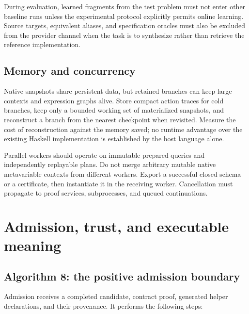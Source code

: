 \documentclass[11pt,letterpaper]{article}
\theoremstyle{definition}\newtheorem{definition}[theorem]{Definition}
\theoremstyle{remark}\newtheorem{remark}[theorem]{Remark}
\begin{document}
During evaluation, learned fragments from the test problem must not enter other
baseline runs unless the experimental protocol explicitly permits online
learning. Source targets, equivalent aliases, and specification oracles must also
be excluded from the provider channel when the task is to synthesize rather
than retrieve the reference implementation.

\subsection{Memory and concurrency}

Native snapshots share persistent data, but retained branches can keep large
contexts and expression graphs alive. Store compact action traces for cold
branches, keep only a bounded working set of materialized snapshots, and
reconstruct a branch from the nearest checkpoint when revisited. Measure the
cost of reconstruction against the memory saved; no runtime advantage over the
existing Haskell implementation is established by the host language alone.

Parallel workers should operate on immutable prepared queries and independently
replayable plans. Do not merge arbitrary mutable native metavariable contexts
from different workers. Export a successful closed schema or a certificate, then
instantiate it in the receiving worker. Cancellation must propagate to proof
services, subprocesses, and queued continuations.

\section{Admission, trust, and executable meaning}
\label{sec:trust}

\subsection{Algorithm 8: the positive admission boundary}

Admission receives a completed candidate, contract proof, generated helper
declarations, and their provenance. It performs the following steps:
\end{document}
